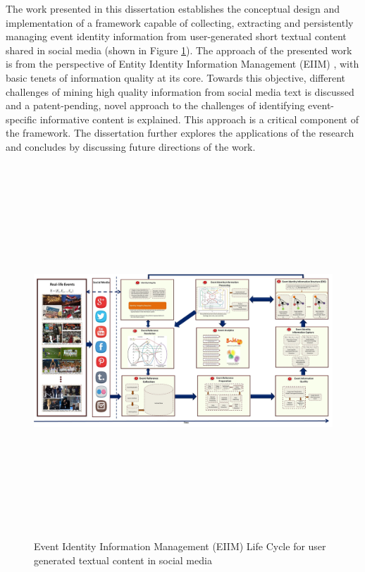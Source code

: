 \indent The work presented in this dissertation establishes the conceptual design and implementation of a framework capable of collecting, extracting and persistently managing event identity information from user-generated short textual content shared in social media (shown in Figure \ref{eiimFig1}). The approach of the presented work is from the perspective of Entity Identity Information Management (EIIM) \cite{zhou2011entity}, with basic tenets of information quality at its core. Towards this objective, different challenges of mining high quality information from social media text is discussed and a patent-pending, novel approach to the challenges of identifying event-specific informative content is explained. This approach is a critical component of the framework. The dissertation further explores the applications of the research and concludes by discussing future directions of the work.



\begin{figure}
\label{eiimFig1}
  \caption{Event Identity Information Management (EIIM) Life Cycle for user generated textual content in social media}
    \includegraphics[width=24cm,height=14cm]{Figures/NewEIIM.jpg}
\end{figure}

